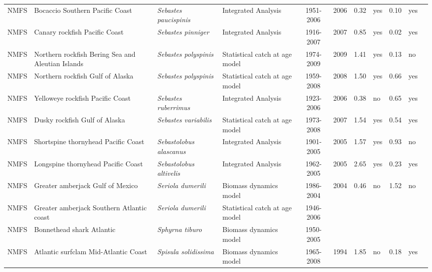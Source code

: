 \begin{longtable}{p{1.8cm}p{3.5cm}p{3.5cm}p{3cm}cccp{0.9cm}cp{0.9cm}c}
  NMFS & Bocaccio Southern Pacific Coast & \textit{Sebastes paucispinis} & Integrated Analysis & 1951-2006 & 2006 & 0.32 & yes & 0.10 & yes & \cite{NWFSC-BOCACCSPCOAST-2007 Bocaccio.pdf} \\ 
  NMFS & Canary rockfish Pacific Coast & \textit{Sebastes pinniger} & Integrated Analysis & 1916-2007 & 2007 & 0.85 & yes & 0.02 & yes & \cite{NWFSC-CROCKPCOAST-2007-Canary.pdf} \\ 
  NMFS & Northern rockfish Bering Sea and Aleutian Islands & \textit{Sebastes polyspinis} & Statistical catch at age model & 1974-2009 & 2009 & 1.41 & yes & 0.13 & no & \cite{2008_SAFE_BSAInorthern.pdf} \\ 
  NMFS & Northern rockfish Gulf of Alaska & \textit{Sebastes polyspinis} & Statistical catch at age model & 1959-2008 & 2008 & 1.50 & yes & 0.66 & yes & \cite{AFSC-NROCKGA-2008-Northern rockfish GA.pdf} \\ 
  NMFS & Yelloweye rockfish Pacific Coast & \textit{Sebastes ruberrimus} & Integrated Analysis & 1923-2006 & 2006 & 0.38 & no & 0.65 & yes & \cite{NWFSC-YEYEROCKPCOAST-2007-yelloweye.pdf} \\ 
  NMFS & Dusky rockfish Gulf of Alaska & \textit{Sebastes variabilis} & Statistical catch at age model & 1973-2008 & 2007 & 1.54 & yes & 0.54 & yes & \cite{AFSC-DUSROCKGA-2008-Dusky rockfish GA.pdf} \\ 
  NMFS & Shortspine thornyhead Pacific Coast & \textit{Sebastolobus alascanus} & Integrated Analysis & 1901-2005 & 2005 & 1.57 & yes & 0.93 & no & \cite{2005-SST-assessment.pdf} \\ 
  NMFS & Longspine thornyhead Pacific Coast & \textit{Sebastolobus altivelis} & Integrated Analysis & 1962-2005 & 2005 & 2.65 & yes & 0.23 & yes & \cite{2005-SAFE-Longspine.pdf} \\ 
  NMFS & Greater amberjack Gulf of Mexico & \textit{Seriola dumerili} & Biomass dynamics model & 1986-2004 & 2004 & 0.46 & no & 1.52 & no & \cite{JENSEN_GRAMBERGM_2006.pdf} \\ 
  NMFS & Greater amberjack Southern Atlantic coast & \textit{Seriola dumerili} & Statistical catch at age model & 1946-2006 &  &  &  &  &  & \cite{JENSEN_GRAMBERSATLC_2008.pdf} \\ 
  NMFS & Bonnethead shark Atlantic & \textit{Sphyrna tiburo} & Biomass dynamics model & 1950-2005 &  &  &  &  &  & \cite{SmallcoastalAtl2007-SEFSC.pdf} \\ 
  NMFS & Atlantic surfclam Mid-Atlantic Coast & \textit{Spisula solidissima} & Biomass dynamics model & 1965-2008 & 1994 & 1.85 & no & 0.18 & yes & \cite{Surfclam2007.pdf} \\ 

\end{longtable}
